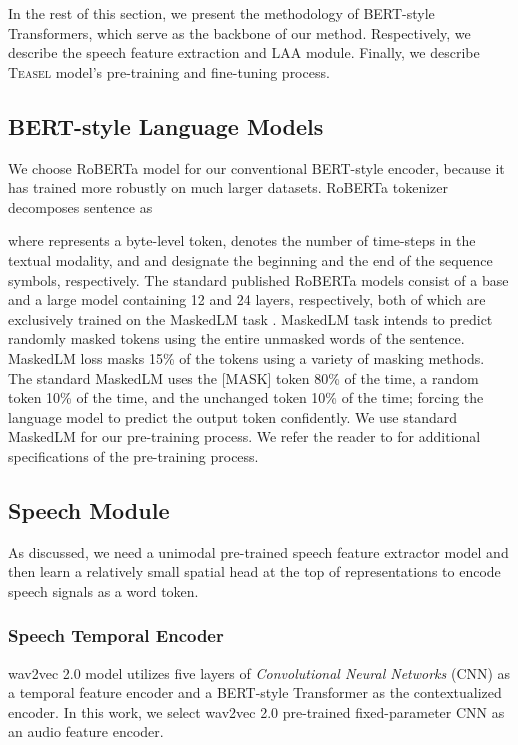\documentclass[letterpaper]{article} \usepackage{spconf,amsmath,graphicx}
\newcommand{\teasel}{\textsc{Teasel }}
\begin{document}
In the rest of this section, we present the methodology of BERT-style Transformers, which serve as the backbone of our method. Respectively, we describe the speech feature extraction and LAA module. Finally, we describe \teasel model's pre-training and fine-tuning process.


\subsection{BERT-style Language Models}

We choose RoBERTa model \cite{liu2019roberta} for our conventional BERT-style encoder, because it has trained more robustly on much larger datasets. RoBERTa tokenizer decomposes sentence   as 

where  represents a byte-level token,  denotes the number of time-steps in the textual modality, and  and  designate the beginning and the end of the sequence symbols, respectively. The standard published RoBERTa models consist of a base and a large model containing 12 and 24 layers, respectively, both of which are exclusively trained on the MaskedLM task \cite{devlin2018bert}. MaskedLM task intends to predict randomly masked tokens using the entire unmasked words of the sentence. MaskedLM loss masks 15\% of the tokens using a variety of masking methods. The standard MaskedLM \cite{devlin2018bert} uses the [MASK] token 80\% of the time, a random token 10\% of the time, and the unchanged token 10\% of the time; forcing the language model to predict the output token confidently. We use standard MaskedLM for our pre-training process. We refer the reader to \cite{devlin2018bert,liu2019roberta} for additional specifications of the pre-training process. 

\subsection{Speech Module}

As discussed, we need a unimodal pre-trained speech feature extractor model and then learn a relatively small spatial head at the top of representations to encode speech signals as a word token.


\subsubsection{Speech Temporal Encoder}

wav2vec 2.0 model \cite{baevski2020wav2vec} utilizes five layers of \textit{Convolutional Neural Networks} (CNN) as a temporal feature encoder and a BERT-style Transformer as the contextualized encoder. In this work, we select wav2vec 2.0 pre-trained fixed-parameter CNN as an audio feature encoder.
\end{document}
